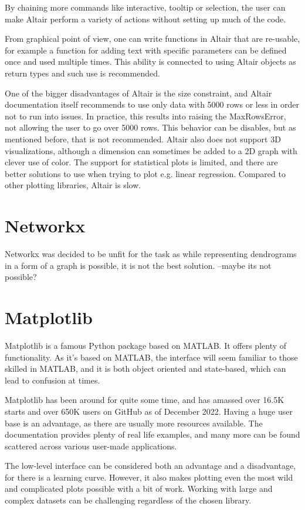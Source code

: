 By chaining more commands like interactive, tooltip or selection, the user can make Altair perform a variety of actions without setting up much of the code. 

From graphical point of view, one can write functions in Altair that are re-usable, for example a function for adding text with specific parameters can be defined once and used multiple times. This ability is connected to using Altair objects as return types and such use is recommended. 

One of the bigger disadvantages of Altair is the size constraint, and Altair documentation itself recommends to use only data with 5000 rows or less in order not to run into issues. In practice, this results into raising the MaxRowsError, not allowing the user to go over 5000 rows. This behavior can be disables, but as mentioned before, that is not recommended. Altair also does not support 3D visualizations, although a dimension can sometimes be added to a 2D graph with clever use of color. The support for statistical plots is limited, and there are better solutions to use when trying to plot e.g. linear regression. Compared to other plotting libraries, Altair is slow. 

\section{Networkx}
\label{sec:networkx}
Networkx was decided to be unfit for the task as while representing dendrograms in a form of a graph is possible, it is not the best solution. --maybe its not possible?

\section{Matplotlib}
\label{sec:matplotlib}
Matplotlib is a famous Python package based on MATLAB. It offers plenty of functionality. As it's based on MATLAB, the interface will seem familiar to those skilled in MATLAB, and it is both object oriented and state-based, which can lead to confusion at times.

Matplotlib has been around for quite some time, and has amassed over 16.5K starts and over 650K users on GitHub as of December 2022. Having a huge user base is an advantage, as there are usually more resources available. The documentation provides plenty of real life examples, and many more can be found scattered across various user-made applications. 

The low-level interface can be considered both an advantage and a disadvantage, for there is a learning curve. However, it also makes plotting even the most wild and complicated plots possible with a bit of work. Working with large and complex datasets can be challenging regardless of the chosen library. 

